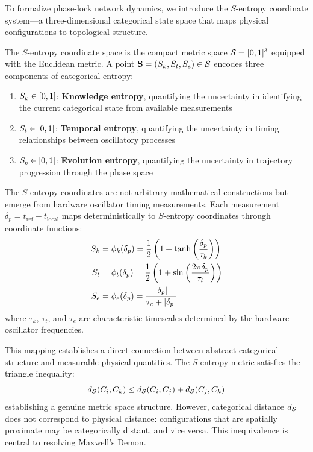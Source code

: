 To formalize phase-lock network dynamics, we introduce the $S$-entropy coordinate system---a three-dimensional categorical state space that maps physical configurations to topological structure.

\begin{definition}
\label{def:s_entropy}
The $S$-entropy coordinate space is the compact metric space $\mathcal{S} = [0,1]^3$ equipped with the Euclidean metric. A point $\mathbf{S} = (S_k, S_t, S_e) \in \mathcal{S}$ encodes three components of categorical entropy:
\begin{enumerate}
\item $S_k \in [0,1]$: \textbf{Knowledge entropy}, quantifying the uncertainty in identifying the current categorical state from available measurements
\item $S_t \in [0,1]$: \textbf{Temporal entropy}, quantifying the uncertainty in timing relationships between oscillatory processes
\item $S_e \in [0,1]$: \textbf{Evolution entropy}, quantifying the uncertainty in trajectory progression through the phase space
\end{enumerate}
\end{definition}

The $S$-entropy coordinates are not arbitrary mathematical constructions but emerge from hardware oscillator timing measurements. Each measurement $\delta_p = t_{\text{ref}} - t_{\text{local}}$ maps deterministically to $S$-entropy coordinates through coordinate functions:
\begin{align}
S_k &= \phi_k(\delta_p) = \frac{1}{2}\left(1 + \tanh\left(\frac{\delta_p}{\tau_k}\right)\right) \label{eq:phi_k} \\
S_t &= \phi_t(\delta_p) = \frac{1}{2}\left(1 + \sin\left(\frac{2\pi \delta_p}{\tau_t}\right)\right) \label{eq:phi_t} \\
S_e &= \phi_e(\delta_p) = \frac{|\delta_p|}{\tau_e + |\delta_p|} \label{eq:phi_e}
\end{align}
where $\tau_k$, $\tau_t$, and $\tau_e$ are characteristic timescales determined by the hardware oscillator frequencies.

This mapping establishes a direct connection between abstract categorical structure and measurable physical quantities. The $S$-entropy metric satisfies the triangle inequality:
\begin{equation}
d_{\mathcal{S}}(C_i, C_k) \leq d_{\mathcal{S}}(C_i, C_j) + d_{\mathcal{S}}(C_j, C_k)
\label{eq:triangle}
\end{equation}
establishing a genuine metric space structure. However, categorical distance $d_{\mathcal{S}}$ does not correspond to physical distance: configurations that are spatially proximate may be categorically distant, and vice versa. This inequivalence is central to resolving Maxwell's Demon.

